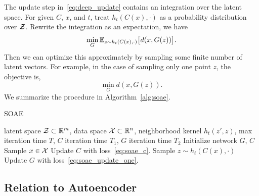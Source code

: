 The update step in~\eqref{eq:deep_update} contains an integration over the latent space.
For given \(C\), \(x\), and \(t\),
treat \(h_t(C(x), \cdot)\) as a probability distribution over \(\mathcal{Z}\).
Rewrite the integration as an expectation,
we have
\begin{equation}\label{eq:soae_update}
    \min_G \mathbb{E}_{z\sim h_t(C(x), \cdot)}\big[d(x, G(z))\big].
\end{equation}
Then we can optimize this approximately by sampling some finite number of latent vectors.
For example,
in the case of sampling only one point \(z\),
the objective is,
\begin{equation}\label{eq:soae_update_one}
    \min_G d(x, G(z)).
\end{equation}
We summarize the procedure in Algorithm~\ref{alg:soae}.

\begin{algorithm}[tb]
    \caption{SOAE}\label{alg:soae}
 \begin{algorithmic}
        latent space \(\mathcal{Z}\subset{\mathbb{R}}^m\),
        data space \(\mathcal{X}\subset{\mathbb{R}}^n\),
        neighborhood kernel \(h_t(z',z)\),
        max iteration time \(T\),
        \(C\) iteration time \(T_1\),
        \(G\) iteration time \(T_2\)
    \STATE Initialize network \(G\), \(C\)
        \STATE Sample \(x\in\mathcal{X}\)
        \STATE Update \(C\) with loss~\eqref{eq:soae_c}.
    \ENDFOR
        \STATE Sample \(z\sim h_t(C(x), \cdot)\)
        \STATE Update \(G\) with loss~\eqref{eq:soae_update_one}.
    \ENDFOR
    \ENDFOR
\end{algorithmic}
\end{algorithm}

\subsection{Relation to Autoencoder}
